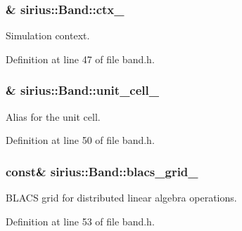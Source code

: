 \subsubsection[{ctx\+\_\+}]{\& sirius\+::\+Band\+::ctx\+\_\+\hspace{0.3cm}{\ttfamily [private]}}\label{classsirius_1_1_band_a355ecbcf2139f3a5ae0ff33aa2409d58}


Simulation context. 



Definition at line 47 of file band.\+h.

\hypertarget{classsirius_1_1_band_a8776f7df889f8bca82ff5a9a24331205}{}
\subsubsection[{unit\+\_\+cell\+\_\+}]{\& sirius\+::\+Band\+::unit\+\_\+cell\+\_\+\hspace{0.3cm}{\ttfamily [private]}}\label{classsirius_1_1_band_a8776f7df889f8bca82ff5a9a24331205}


Alias for the unit cell. 



Definition at line 50 of file band.\+h.

\hypertarget{classsirius_1_1_band_a621c3610318f8b26c0f4167c3a0dca76}{}
\subsubsection[{blacs\+\_\+grid\+\_\+}]{ const\& sirius\+::\+Band\+::blacs\+\_\+grid\+\_\+\hspace{0.3cm}{\ttfamily [private]}}\label{classsirius_1_1_band_a621c3610318f8b26c0f4167c3a0dca76}


B\+L\+A\+C\+S grid for distributed linear algebra operations. 



Definition at line 53 of file band.\+h.

\hypertarget{classsirius_1_1_band_a20c18e018c120ad6f901d046720decce}{}
